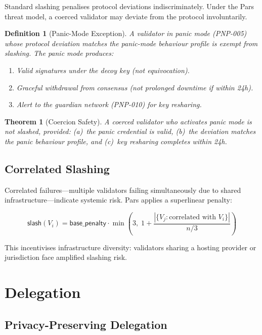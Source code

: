 \documentclass[11pt,a4paper]{article}
\newtheorem{definition}{Definition}[section]
\newtheorem{theorem}{Theorem}[section]
\begin{document}
Standard slashing penalises protocol deviations indiscriminately.  Under
the Pars threat model, a coerced validator may deviate from the protocol
involuntarily.

\begin{definition}[Panic-Mode Exception]
    A validator in panic mode (PNP-005) whose protocol deviation matches
    the panic-mode behaviour profile is exempt from slashing.  The panic
    mode produces:
    \begin{enumerate}[label=(\roman*)]
        \item Valid signatures under the decoy key (not equivocation).
        \item Graceful withdrawal from consensus (not prolonged downtime
        if within 24h).
        \item Alert to the guardian network (PNP-010) for key resharing.
    \end{enumerate}
\end{definition}

\begin{theorem}[Coercion Safety]
    A coerced validator who activates panic mode is not slashed, provided:
    (a)~the panic credential is valid, (b)~the deviation matches the
    panic behaviour profile, and (c)~key resharing completes within 24h.
\end{theorem}

\subsection{Correlated Slashing}

Correlated failures---multiple validators failing simultaneously due to
shared infrastructure---indicate systemic risk.  Pars applies a
superlinear penalty:

\[
    \mathsf{slash}(V_i) = \mathsf{base\_penalty} \cdot
    \min\!\left(3,\; 1 + \frac{|\{V_j : \text{correlated with } V_i\}|}{
    n/3}\right)
\]

This incentivises infrastructure diversity: validators sharing a hosting
provider or jurisdiction face amplified slashing risk.

\section{Delegation}
\label{sec:delegation}

\subsection{Privacy-Preserving Delegation}
\end{document}
